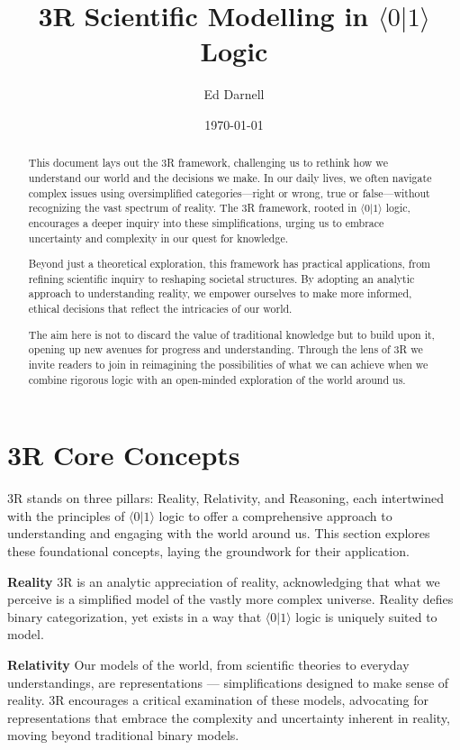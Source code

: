 \documentclass[12pt]{article}
\author{Ed Darnell}
\date{\today}
\newcommand{\qbit}{\ensuremath{\langle 0 | 1 \rangle}}
\begin{document}
\title{3R Scientific Modelling in \qbit{} Logic}

\begin{abstract}
    This document lays out the 3R framework, challenging us to rethink how we understand our world and the decisions we make. In our daily lives, we often navigate complex issues using oversimplified categories—right or wrong, true or false—without recognizing the vast spectrum of reality. The 3R framework, rooted in \qbit{} logic, encourages a deeper inquiry into these simplifications, urging us to embrace uncertainty and complexity in our quest for knowledge.

    Beyond just a theoretical exploration, this framework has practical applications, from refining scientific inquiry to reshaping societal structures. By adopting an analytic approach to understanding reality, we empower ourselves to make more informed, ethical decisions that reflect the intricacies of our world.

    The aim here is not to discard the value of traditional knowledge but to build upon it, opening up new avenues for progress and understanding. Through the lens of 3R we invite readers to join in reimagining the possibilities of what we can achieve when we combine rigorous logic with an open-minded exploration of the world around us.
\end{abstract}

\section*{3R Core Concepts}

3R stands on three pillars: Reality, Relativity, and Reasoning, each intertwined with the principles of \qbit{} logic to offer a comprehensive approach to understanding and engaging with the world around us. This section explores these foundational concepts, laying the groundwork for their application.

\textbf{Reality}
3R is an analytic appreciation of reality, acknowledging that what we perceive is a simplified model of the vastly more complex universe. Reality defies binary categorization, yet exists in a way that \qbit{} logic is uniquely suited to model.

\textbf{Relativity}
Our models of the world, from scientific theories to everyday understandings, are representations — simplifications designed to make sense of reality. 3R encourages a critical examination of these models, advocating for representations that embrace the complexity and uncertainty inherent in reality, moving beyond traditional binary models.
\end{document}
